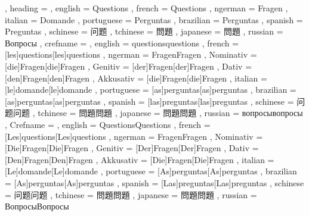   {
    , heading =   {
                    , english     = Questions
                    , french      = Questions
                    , ngerman     = Fragen
                    , italian     = Domande
                    , portuguese  = Perguntas
                    , brazilian   = Perguntas
                    , spanish     = Preguntas
                    , schinese    = 问题
                    , tchinese    = 問題
                    , japanese    = 問題
                    , russian     = Вопросы
                  }
    , crefname =  {
                    , english     = {questions}{questions}
                    , french      = [les]{questions}[les]{questions}
                    , ngerman     = { {Fragen}{Fragen}
                                      , Nominativ = [die]{Fragen}[die]{Fragen}
                                      , Genitiv   = [der]{Fragen}[der]{Fragen}
                                      , Dativ     = [den]{Fragen}[den]{Fragen}
                                      , Akkusativ = [die]{Fragen}[die]{Fragen}
                                    }
                    , italian     = [le]{domande}[le]{domande}
                    , portuguese  = [as]{perguntas}[as]{perguntas}
                    , brazilian   = [as]{perguntas}[as]{perguntas}
                    , spanish     = [las]{preguntas}[las]{preguntas}
                    , schinese    = {问题}{问题}
                    , tchinese    = {問題}{問題}
                    , japanese    = {問題}{問題}
                    , russian     = {вопросы}{вопросы}
                  }
    , Crefname =  {
                    , english     = {Questions}{Questions}
                    , french      = [Les]{questions}[Les]{questions}
                    , ngerman     = { {Fragen}{Fragen}
                                      , Nominativ = [Die]{Fragen}[Die]{Fragen}
                                      , Genitiv   = [Der]{Fragen}[Der]{Fragen}
                                      , Dativ     = [Den]{Fragen}[Den]{Fragen}
                                      , Akkusativ = [Die]{Fragen}[Die]{Fragen}
                                    }
                    , italian     = [Le]{domande}[Le]{domande}
                    , portuguese  = [As]{perguntas}[As]{perguntas}
                    , brazilian   = [As]{perguntas}[As]{perguntas}
                    , spanish     = [Las]{preguntas}[Las]{preguntas}
                    , schinese    = {问题}{问题}
                    , tchinese    = {問題}{問題}
                    , japanese    = {問題}{問題}
                    , russian     = {Вопросы}{Вопросы}
                  }
  }

